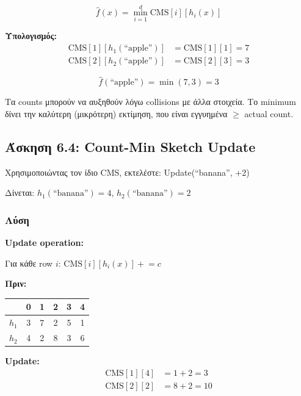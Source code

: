 $$\hat{f}(x) = \min_{i=1}^{d} \text{CMS}[i][h_i(x)]$$

\textbf{Υπολογισμός:}
\begin{align*}
\text{CMS}[1][h_1(\text{``apple''})] &= \text{CMS}[1][1] = 7 \\
\text{CMS}[2][h_2(\text{``apple''})] &= \text{CMS}[2][3] = 3
\end{align*}

$$\hat{f}(\text{``apple''}) = \min(7, 3) = 3$$

\begin{infobox}
Τα counts μπορούν να αυξηθούν λόγω collisions με άλλα στοιχεία.
Το minimum δίνει την καλύτερη (μικρότερη) εκτίμηση, που είναι εγγυημένα $\geq$ actual count.
\end{infobox}

\subsection{Άσκηση 6.4: Count-Min Sketch Update}

\begin{formulabox}[Εκφώνηση]
Χρησιμοποιώντας τον ίδιο CMS, εκτελέστε: Update(``banana'', +2)

Δίνεται: $h_1(\text{``banana''}) = 4$, $h_2(\text{``banana''}) = 2$
\end{formulabox}

\subsubsection*{Λύση}

\textbf{Update operation:}

Για κάθε row $i$: $\text{CMS}[i][h_i(x)] \mathrel{+}= c$

\textbf{Πριν:}
\begin{center}
\begin{tabular}{c|ccccc}
 & 0 & 1 & 2 & 3 & 4 \\
\hline
$h_1$ & 3 & 7 & 2 & 5 & 1 \\
$h_2$ & 4 & 2 & 8 & 3 & 6 \\
\end{tabular}
\end{center}

\textbf{Update:}
\begin{align*}
\text{CMS}[1][4] &= 1 + 2 = 3 \\
\text{CMS}[2][2] &= 8 + 2 = 10
\end{align*}

